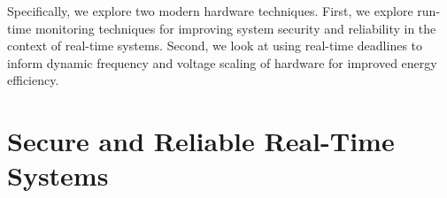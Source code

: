 Specifically, we explore two modern hardware techniques. First, we explore
run-time monitoring techniques for improving system security and reliability in
the context of real-time systems. Second, we look at using real-time deadlines
to inform dynamic frequency and voltage scaling of hardware for improved energy efficiency.

% 

\section{Secure and Reliable Real-Time Systems}
\label{sec:intro.security}

